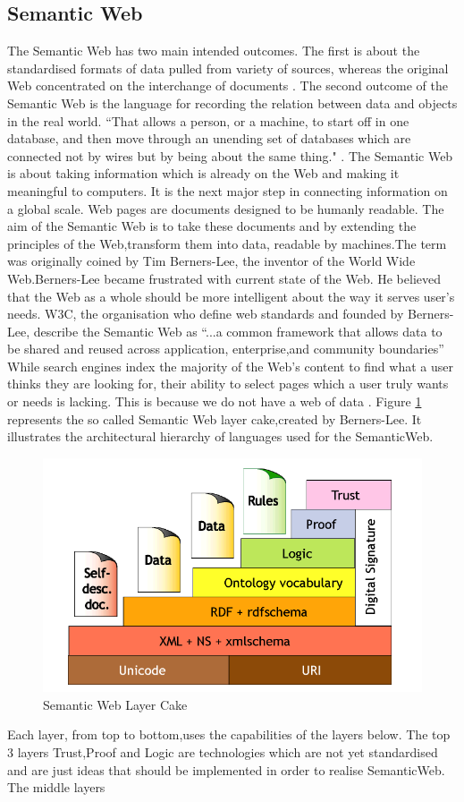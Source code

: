 \subsection{Semantic Web}\label{semanticweb}
The Semantic Web has two main intended outcomes. The first is about the standardised formats of data pulled from variety of sources, whereas the original Web concentrated on the interchange of documents \cite{semantic}. The second outcome of the Semantic Web is the language for recording the relation between data and objects in the real world. ``That allows a person, or a machine, to start off in one database, and then move through an unending set of databases which are connected not by wires but by being about the same thing."  \cite{semantic}.  The Semantic Web is about taking information which is already on the Web and making it meaningful to computers. It is the next major step in connecting information on a global scale. Web pages are documents designed to be humanly readable. The aim of the Semantic Web is to take these documents and by extending the principles of the Web,transform them into data, readable by machines.The term was originally coined by Tim Berners-Lee, the inventor of the World Wide Web.Berners-Lee became frustrated with current state of the Web. He believed that the Web as a whole should be more intelligent about the way it serves user's needs. W3C, the organisation who define web standards and founded by Berners-Lee, describe the Semantic Web as ``...a common framework that allows data to be shared and reused across application, enterprise,and community boundaries'' \cite{13} While search engines index the majority of the Web's content to find what a user thinks they are looking for, their ability to select pages which a user truly wants or needs is lacking. This is because we do not have a web of data \cite{12}. Figure \ref{fig:sw} represents the so called Semantic Web layer cake,created by Berners-Lee. It illustrates the architectural hierarchy of languages used for the SemanticWeb. \begin{figure}\includegraphics[width=1\linewidth]{images/semanticwebcake}\caption{Semantic Web Layer Cake \cite{cake}}\label{fig:sw}\end{figure} Each layer, from top to bottom,uses the capabilities of the layers below. The top 3 layers Trust,Proof and Logic are technologies which are not yet standardised and are just ideas that should be implemented in order to realise SemanticWeb. The middle layers 